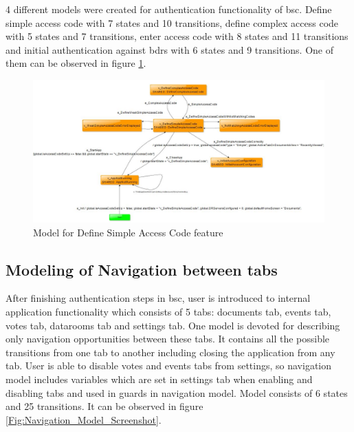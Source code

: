 \par
4 different models were created for authentication functionality of \acrshort{bsc}. Define simple access code with 7 states and 10 transitions, define complex access code with 5 states and 7 transitions, enter access code with 8 states and 11 transitions and initial authentication against \acrshort{bdrs} with 6 states and 9 transitions. One of them can be observed in figure \ref{Fig:Authentication_Model_Screenshot}.

\begin{figure} [htbp!]
	\centering
					\includegraphics[width=1\textwidth]{figures/Authentication_model_screenshot}
					\caption{\label{Fig:Authentication_Model_Screenshot} Model for Define Simple Access Code feature}
\end{figure}

\subsection{Modeling of Navigation between tabs}
\par
After finishing authentication steps in \acrshort{bsc}, user is introduced to internal application functionality which consists of 5 tabs: documents tab, events tab, votes tab, datarooms tab and settings tab. One model is devoted for describing only navigation opportunities between these tabs. It contains all the possible transitions from one tab to another including closing the application from any tab. User is able to disable votes and events tabs from settings, so navigation model includes variables which are set in settings tab when enabling and disabling tabs and used in guards in navigation model. Model consists of 6 states and 25 transitions. It can be observed in figure \ref{Fig:Navigation_Model_Screenshot}.

